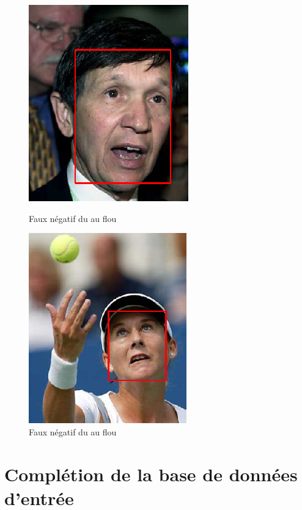 \documentclass[a4paper,11pt]{article}
\begin{document}
\begin{figure}[H]
    \centering
    \begin{minipage}[c]{0.50\linewidth}
        \begin{center}
            \includegraphics[scale=0.45]{facenetFN3.png}
            \caption{Faux négatif du au flou}
        \end{center}
    \end{minipage} \hfill
    \begin{minipage}[c]{0.45\linewidth}
        \begin{center}
            \includegraphics[scale=0.52]{facenetFN4.png}
            \caption{Faux négatif du au flou}
        \end{center}
    \end{minipage}
\end{figure}

\section{Complétion de la base de données d'entrée}
\label{sec:completion}
    
\end{document}
